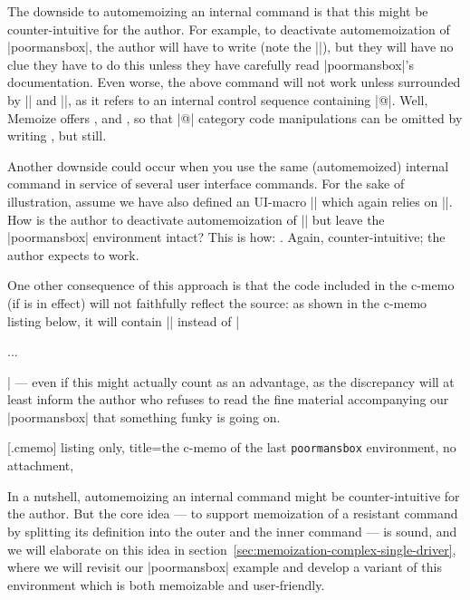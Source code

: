 \documentclass[a4paper,11pt]{article}
\begin{document}
The downside to automemoizing an internal command is that this might be
counter-intuitive for the author.  For example, to deactivate automemoization
of |poormansbox|, the author will have to write
 (note the
|\@|), but they will have no clue they have to do this unless they have
carefully read |poormansbox|'s documentation.  Even worse, the above
 command will not work unless surrounded by |\makeatletter| and
|\makeatother|, as it refers to an internal control sequence containing |@|.
Well, Memoize offers ,  and
, so that |@| category code manipulations can be
omitted by writing , but still.

Another downside could occur when you use the same (automemoized) internal
command in service of several user interface commands.  For the sake of
illustration, assume we have also defined an UI-macro |\pmb| which again relies
on |\@poormansbox|.  How is the author to deactivate automemoization of |\pmb|
but leave the |poormansbox| environment intact?  This is how:
.  Again, counter-intuitive; the author expects
 to work.

One other consequence of this approach is that the code included in the c-memo
(if  is in effect) will not faithfully reflect
the source: as shown in the c-memo listing below, it will contain
|| instead of |\begin{poormansbox}...\end{poormansbox}| ---
even if this might actually count as an advantage, as the discrepancy will at
least inform the author who refuses to read the fine material accompanying our
|poormansbox| that something funky is going on.

[.cmemo]{
  listing only,
  title=the c-memo of the last \texttt{poormansbox} environment,
  no attachment,
}


In a nutshell, automemoizing an internal command might be counter-intuitive for
the author.  But the core idea --- to support memoization of a resistant
command by splitting its definition into the outer and the inner command --- is
sound, and we will elaborate on this idea in
section~\ref{sec:memoization-complex-single-driver}, where we will revisit our
|poormansbox| example and develop a variant of this environment which is both
memoizable and user-friendly.
\end{document}
